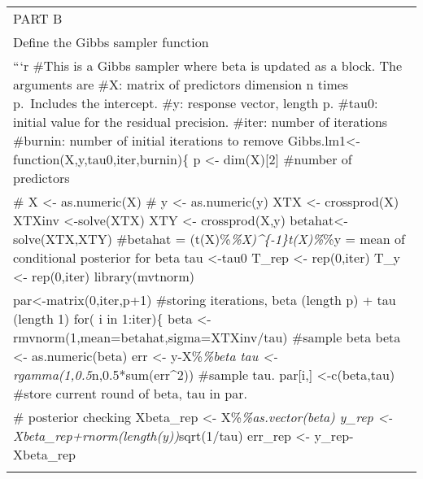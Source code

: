 \documentclass[]{article}
\begin{document}
\begin{longtable}[]{@{}l@{}}
\toprule
\begin{minipage}[t]{0.97\columnwidth}\raggedright\strut
PART B\strut
\end{minipage}\tabularnewline
\begin{minipage}[t]{0.97\columnwidth}\raggedright\strut
Define the Gibbs sampler function\strut
\end{minipage}\tabularnewline
\begin{minipage}[t]{0.97\columnwidth}\raggedright\strut
```r \#This is a Gibbs sampler where beta is updated as a block. The
arguments are \#X: matrix of predictors dimension n times p.~Includes
the intercept. \#y: response vector, length p. \#tau0: initial value for
the residual precision. \#iter: number of iterations \#burnin: number of
initial iterations to remove
Gibbs.lm1\textless{}-function(X,y,tau0,iter,burnin)\{ p \textless{}-
dim(X){[}2{]} \#number of predictors\strut
\end{minipage}\tabularnewline
\begin{minipage}[t]{0.97\columnwidth}\raggedright\strut
\# X \textless{}- as.numeric(X) \# y \textless{}- as.numeric(y) XTX
\textless{}- crossprod(X) XTXinv \textless{}-solve(XTX) XTY \textless{}-
crossprod(X,y) betahat\textless{}-solve(XTX,XTY) \#betahat =
(t(X)\%\emph{\%X)\^{}\{-1\}t(X)\%}\%y = mean of conditional posterior
for beta tau \textless{}-tau0 T\_rep \textless{}- rep(0,iter) T\_y
\textless{}- rep(0,iter) library(mvtnorm)\strut
\end{minipage}\tabularnewline
\begin{minipage}[t]{0.97\columnwidth}\raggedright\strut
par\textless{}-matrix(0,iter,p+1) \#storing iterations, beta (length p)
+ tau (length 1) for( i in 1:iter)\{ beta \textless{}-
rmvnorm(1,mean=betahat,sigma=XTXinv/tau) \#sample beta beta \textless{}-
as.numeric(beta) err \textless{}- y-X\%\emph{\%beta tau \textless{}-
rgamma(1,0.5}n,0.5*sum(err\^{}2)) \#sample tau. par{[}i,{]}
\textless{}-c(beta,tau) \#store current round of beta, tau in par.\strut
\end{minipage}\tabularnewline
\begin{minipage}[t]{0.97\columnwidth}\raggedright\strut
\# posterior checking Xbeta\_rep \textless{}- X\%\emph{\%as.vector(beta)
y\_rep \textless{}- Xbeta\_rep+rnorm(length(y))}sqrt(1/tau) err\_rep
\textless{}- y\_rep-Xbeta\_rep\strut
\end{minipage}\tabularnewline
\begin{minipage}[t]{0.97\columnwidth}\raggedright\strut

\end{minipage}
\end{longtable}
\end{document}
